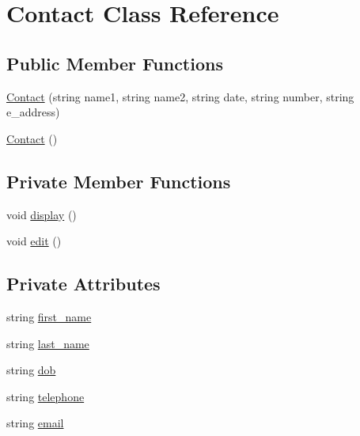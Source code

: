 \hypertarget{classContact}{}\section{Contact Class Reference}
\label{classContact}
\subsection*{Public Member Functions}
\begin{DoxyCompactItemize}
\item 
\hyperlink{classContact_ac0c3c018b56acb9a064f017a00a3a0c1}{Contact} (string name1, string name2, string date, string number, string e\+\_\+address)
\item 
\hyperlink{classContact_ae39444f378e6de7fd6c3e60981949af5}{Contact} ()
\end{DoxyCompactItemize}
\subsection*{Private Member Functions}
\begin{DoxyCompactItemize}
\item 
void \hyperlink{classContact_a1a7b491fba3111a679bfae344d75d19d}{display} ()
\item 
void \hyperlink{classContact_a1e8e2536913df381990b8ed35d562dd6}{edit} ()
\end{DoxyCompactItemize}
\subsection*{Private Attributes}
\begin{DoxyCompactItemize}
\item 
string \hyperlink{classContact_ac074ba210aa0e4a52921af8353384a59}{first\+\_\+name}
\item 
string \hyperlink{classContact_a87032ae00ab0e8cc81d660f191bcf0fa}{last\+\_\+name}
\item 
string \hyperlink{classContact_a50397132da5dc66f2cb289fc650c3df6}{dob}
\item 
string \hyperlink{classContact_ad23a96ecf0527e8878da50da682ba794}{telephone}
\item 
string \hyperlink{classContact_a7cb8a0ab45d0ddc7a83df39590fcb6c1}{email}
\end{DoxyCompactItemize}
